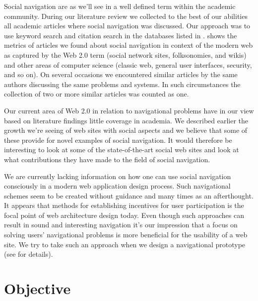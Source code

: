 Social navigation are as we'll see in
a well defined term within the academic community.
During our literature review we collected to the best of our abilities all
academic articles where social navigation was discussed. Our approach was to
use keyword search and citation search in the databases listed in
.%
 shows the metrics of articles
we found about social navigation in context of the modern web as captured by
the Web 2.0 term (social network sites, folksonomies, and wikis) and other
areas of computer science (classic web, general user interfaces, security, and
so on).
On several occasions we encountered similar articles by the same authors
discussing the same problems and systems. In such circumstances the collection
of two or more similar articles was counted as one.

Our current area of Web 2.0 in relation to navigational problems have in our
view based on literature findings little coverage in academia.
We described earlier the growth we're seeing of web sites with social
aspects and we believe that some of these provide for novel examples of social
navigation. It would therefore be interesting to look at some of the
state-of-the-art social web sites and look at what contributions they have
made to the field of social navigation.

We are currently lacking information on how one can use social navigation
consciously in a modern web application design process. Such navigational
schemes seem to be created without guidance and many times as an afterthought.
It appears that methods for establishing incentives for user participation
is the focal point of web architecture design today. Even though such
approaches can result in sound and interesting navigation it's our impression
that a focus on solving users' navigational problems is more beneficial for
the usability of a web site. We try to take such an approach when we design a
navigational prototype (see  for details).

\section{Objective}

